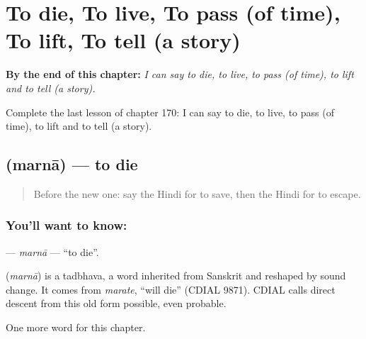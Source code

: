 
\chapter{To die, To live, To pass (of time), To lift, To tell (a story)}
\label{ch:hi-to-die-to-live-to-pass-of-time-to-lift-to-tell-a-story}

\begin{chapteropening}
\textbf{By the end of this chapter:} \emph{I can say to die, to live, to pass (of time), to lift and to tell (a story).}

Complete the last lesson of chapter 170: I can say to die, to live, to pass (of time), to lift and to tell (a story).
\end{chapteropening}

\section[\texorpdfstring{\hi{मरना} (marnā)}{मरना (marnā)}]{ (marnā) — to die}

\label{lesson:HI-C170-marna}



\begin{quote}
Before the new one: say the Hindi for to save, then the Hindi for to escape.
\end{quote}

\subsection*{You'll want to know: }
\textbf{} — \emph{marnā} — \textquotedblleft{}to die\textquotedblright{}.

\begin{cousinweb}
\textbf{} (\emph{marnā}) is a tadbhava, a word inherited from Sanskrit and reshaped by sound change. It comes from \emph{marate}, \textquotedblleft{}will die\textquotedblright{} (CDIAL 9871). CDIAL calls direct descent from this old form possible, even probable.
\end{cousinweb}

\begin{grammarlens}[title={What you've built}]
One more word for this chapter.
\end{grammarlens}

